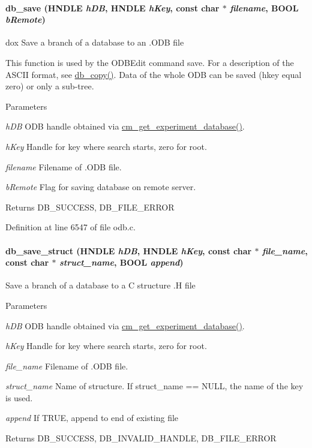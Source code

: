 \paragraph[{db\_\-save}]{ db\_\-save (HNDLE {\em hDB}, \/  HNDLE {\em hKey}, \/  const char $\ast$ {\em filename}, \/  {\bf BOOL} {\em bRemote})}\hfill\label{group__odbfunctionc_ga6f9a61b316a1c2a5c9c143fc84edf63b}
dox Save a branch of a database to an .ODB file

This function is used by the ODBEdit command save. For a description of the ASCII format, see \hyperlink{group__odbfunctionc_ga165f2428c082852ff2ac1e8c4c78d607}{db\_\-copy()}. Data of the whole ODB can be saved (hkey equal zero) or only a sub-\/tree. 
\begin{DoxyParams}{Parameters}
\item[{\em hDB}]ODB handle obtained via \hyperlink{group__cmfunctionc_ga16b33b70783a3f5ba98b4094149d12b7}{cm\_\-get\_\-experiment\_\-database()}. \item[{\em hKey}]Handle for key where search starts, zero for root. \item[{\em filename}]Filename of .ODB file. \item[{\em bRemote}]Flag for saving database on remote server. \end{DoxyParams}
\begin{DoxyReturn}{Returns}
DB\_\-SUCCESS, DB\_\-FILE\_\-ERROR 
\end{DoxyReturn}


Definition at line 6547 of file odb.c.
\paragraph[{db\_\-save\_\-struct}]{ db\_\-save\_\-struct (HNDLE {\em hDB}, \/  HNDLE {\em hKey}, \/  const char $\ast$ {\em file\_\-name}, \/  const char $\ast$ {\em struct\_\-name}, \/  {\bf BOOL} {\em append})}\hfill\label{group__odbfunctionc_ga07197b44867ca47300b1f69f2c2c3e86}
Save a branch of a database to a C structure .H file 
\begin{DoxyParams}{Parameters}
\item[{\em hDB}]ODB handle obtained via \hyperlink{group__cmfunctionc_ga16b33b70783a3f5ba98b4094149d12b7}{cm\_\-get\_\-experiment\_\-database()}. \item[{\em hKey}]Handle for key where search starts, zero for root. \item[{\em file\_\-name}]Filename of .ODB file. \item[{\em struct\_\-name}]Name of structure. If struct\_\-name == NULL, the name of the key is used. \item[{\em append}]If TRUE, append to end of existing file \end{DoxyParams}
\begin{DoxyReturn}{Returns}
DB\_\-SUCCESS, DB\_\-INVALID\_\-HANDLE, DB\_\-FILE\_\-ERROR 
\end{DoxyReturn}



